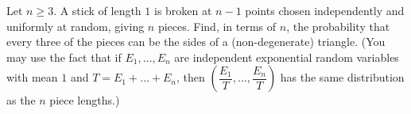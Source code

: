 Let $n\ge3$. A stick of length $1$ is broken at $n-1$ points chosen independently and uniformly at random, giving $n$ pieces. Find, in terms of $n$, the probability that every three of the pieces can be the sides of a (non-degenerate) triangle. (You may use the fact that if $E_1,\dots,E_n$ are independent exponential random variables with mean $1$ and $T=E_1+\dots+E_n$, then $\left(\dfrac{E_1}{T},\dots,\dfrac{E_n}{T}\right)$ has the same distribution as the $n$ piece lengths.)
